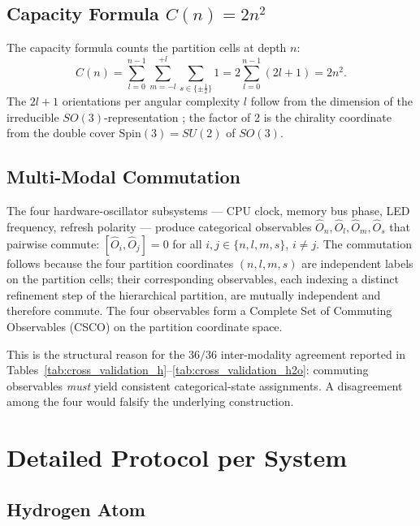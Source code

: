 \documentclass[11pt,a4paper]{article}
\theoremstyle{stmtstyle}
\theoremstyle{definition}
\theoremstyle{remark}
\begin{document}
\subsection{Capacity Formula $C(n) = 2n^{2}$}

The capacity formula counts the partition cells at depth $n$:
\begin{equation}
C(n) = \sum_{l=0}^{n-1} \sum_{m=-l}^{+l} \sum_{s\in\{\pm\tfrac{1}{2}\}} 1 = 2 \sum_{l=0}^{n-1}(2l+1) = 2 n^{2}.
\end{equation}
The $2l+1$ orientations per angular complexity $l$ follow from the dimension of the irreducible $SO(3)$-representation \citep{wigner1959,naimark1964}; the factor of 2 is the chirality coordinate from the double cover $\mathrm{Spin}(3) = SU(2)$ of $SO(3)$.

\subsection{Multi-Modal Commutation}
\label{sec:methods_commutation}

The four hardware-oscillator subsystems --- CPU clock, memory bus phase, LED frequency, refresh polarity --- produce categorical observables $\hat{O}_{n}, \hat{O}_{l}, \hat{O}_{m}, \hat{O}_{s}$ that pairwise commute: $[\hat{O}_{i}, \hat{O}_{j}] = 0$ for all $i, j \in \{n, l, m, s\}$, $i \neq j$. The commutation follows because the four partition coordinates $(n, l, m, s)$ are independent labels on the partition cells; their corresponding observables, each indexing a distinct refinement step of the hierarchical partition, are mutually independent and therefore commute. The four observables form a Complete Set of Commuting Observables (CSCO) on the partition coordinate space.

This is the structural reason for the $36/36$ inter-modality agreement reported in Tables~\ref{tab:cross_validation_h}--\ref{tab:cross_validation_h2o}: commuting observables \emph{must} yield consistent categorical-state assignments. A disagreement among the four would falsify the underlying construction.

\section{Detailed Protocol per System}
\label{sec:methods_systems}

\subsection{Hydrogen Atom}
\label{sec:methods_h}
\end{document}
